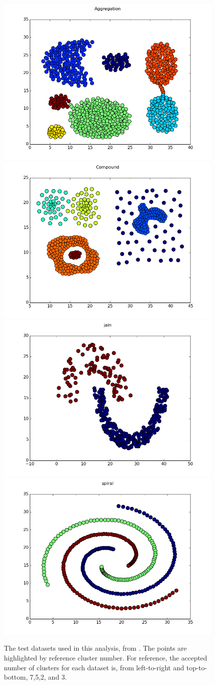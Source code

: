 \documentclass[12pt]{article}
\begin{document}
\begin{figure}[ht]
\centering
\includegraphics[width=0.47\linewidth]{../plots/datasets/Aggregation}
\includegraphics[width=0.47\linewidth]{../plots/datasets/Compound} \\
\includegraphics[width=0.47\linewidth]{../plots/datasets/jain}
\includegraphics[width=0.47\linewidth]{../plots/datasets/spiral}
\caption{The test datasets used in this analysis, from \cite{datasets}. The points are highlighted by reference cluster number. For reference, the accepted number of clusters for each dataset is, from left-to-right and top-to-bottom, 7,5,2, and 3.}
\label{fig:distributions}
\end{figure}
\end{document}
